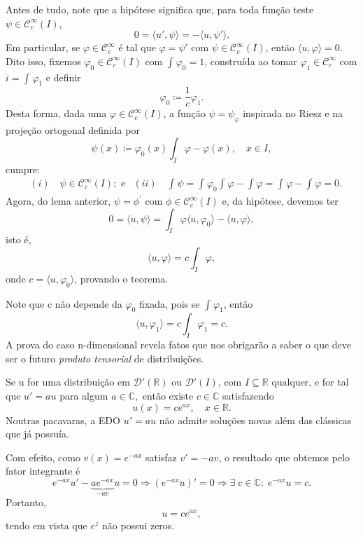 \documentclass[../distribution_theory_notes.tex]{subfiles}
\begin{document}
\begin{proof*}
	Antes de tudo, note que a hipótese significa que, para toda função teste \(\psi \in \mathcal{C}_{c}^{\infty}(I)\),
	\[
		0=\langle u', \psi  \rangle = - \langle u, \psi ' \rangle.
	\]
	Em particular, se \(\varphi \in \mathcal{C}_{c}^{\infty}\) é tal que \(\varphi = \psi '\) com \(\psi \in \mathcal{C}_{c}^{\infty}(I)\), então \(\langle u, \varphi  \rangle=0\). Dito isso, fixemos \(\varphi_{0}\in \mathcal{C}_{c}^{\infty}(I)\) com \(\int_{}^{}\varphi_{0}=1\), construída ao tomar \(\varphi_1\in \mathcal{C}_{c}^{\infty}\) com \(i=\int_{}^{}\varphi_1\) e definir
	\[
		\varphi_{0}\coloneqq \frac{1}{c}\varphi_1.
	\]
	Desta forma, dada uma \(\varphi \in \mathcal{C}_{c}^{\infty}(I)\), a função \(\psi =\psi_{\varphi }\) inspirada no Riesz e na projeção ortogonal definida por
	\[
		\psi (x)\coloneqq \varphi_{0}(x) \int_{I}^{}\varphi - \varphi (x),\quad x\in I,
	\]
	cumpre:
	\begin{align*}
		 & (i)\quad \psi \in \mathcal{C}_{c}^{\infty}(I); \text{ e}
		 & (ii)\quad \int_{}^{}\psi = \int_{}^{}\varphi_{0} \int_{}^{}\varphi - \int_{}^{}\varphi = \int_{}^{}\varphi - \int_{}^{}\varphi =0.
	\end{align*}
	Agora, do lema anterior, \(\psi =\phi^{'}\) com \(\phi\in \mathcal{C}_{c}^{\infty}(I)\) e, da hipótese, devemos ter
	\[
		0=\langle u, \psi  \rangle = \int_{I}^{}\varphi \langle u, \varphi_{0} \rangle - \langle u, \varphi  \rangle,
	\]
	isto é,
	\[
		\langle u, \varphi  \rangle = c \int_{I}^{}\varphi,
	\]
	onde \(c = \langle u, \varphi_{0} \rangle\), provando o teorema. \qedsymbol
\end{proof*}
\begin{tcolorbox}[
		skin=enhanced,
		title=Observação,
		fonttitle=\bfseries,
		colframe=black,
		colbacktitle=cyan!75!white,
		colback=cyan!15,
		colbacklower=black,
		coltitle=black,
		drop fuzzy shadow,
	]
	Note que c não depende da \(\varphi_{0}\) fixada, pois se \(\int_{}^{}\varphi_1\), então
	\[
		\langle u, \varphi_1 \rangle = c \int_{I}^{}\varphi_1 = c.
	\]
	A prova do caso n-dimensional revela fatos que nos obrigarão a saber o que deve ser o futuro \textit{produto tensorial} de distribuições.
\end{tcolorbox}

\begin{crl*}
	Se u for uma distribuição em \(\mathcal{D}'(\mathbb{R})\) ou \(\mathcal{D}'(I)\), com \(I\subseteq \mathbb{R}\) qualquer, e for tal que \(u'= au\) para algum \(a\in \mathbb{C},\) então existe \(c\in \mathbb{C}\) satisfazendo
	\[
		u(x)=ce^{ax},\quad x\in \mathbb{R}.
	\]
	Noutras pacavaras, a EDO \(u'= au\) não admite soluções novas além das clássicas que já possuía.
\end{crl*}
\begin{proof*}
	Com efeito, como \(v(x)=e^{-ax}\) satisfaz \(v'= - av\), o resultado que obtemos pelo fator integrante é
	\[
		e^{-ax}u' - \underbrace{a e^{-ax}}_{-av}u = 0 \Rightarrow (e^{-ax}u)'=0 \Rightarrow \exists\; c\in \mathbb{C}:\; e^{-ax}u = c.
	\]
	Portanto,
	\[
		u = c e^{ax},
	\]
	tendo em vista que \(e^{z}\) não possui zeros. \qedsymbol
\end{proof*}
\end{document}
